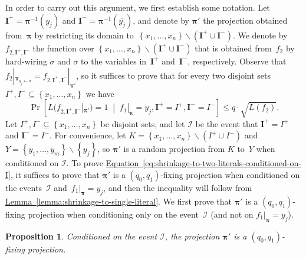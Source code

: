 \documentclass[11pt]{article}
\numberwithin{equation}{section}
\newtheorem{proposition}[theorem]{Proposition}
\theoremstyle{definition}
\theoremstyle{plain}
\newcommand{\expref}[2]{\hyperref[#2]{#1~\ref{#2}}}
\theoremstyle{definition}\newtheorem{notation}[theorem]{Notation}\theoremstyle{plain}
\newcommand{\p}{\boldsymbol{\pi}}
\newcommand{\cI}{\mathcal{I}}
\newcommand{\bI}{\boldsymbol{I}}
\theoremstyle{definition}
\theoremstyle{plain}
\begin{document}
In order to carry out this argument, we first establish some notation.
Let $\bI^{+}=\p^{-1}(y_{j})$ and $\bI^{-}=\p^{-1}(\overline{y_{j}})$,
and denote by $\p'$ the projection obtained from~$\p$ by restricting
its domain to~$\left\{ x_{1},\ldots,x_{n}\right\} \backslash(\bI^{+}\cup\bI^{-})$.
We denote by $f_{2,\bI^{+},\bI^{-}}$ the function over $\left\{ x_{1},\ldots,x_{n}\right\} \backslash(\bI^{+}\cup\bI^{-})$
that is obtained from~$f_{2}$ by hard-wiring $\sigma$ and $\overline{\sigma}$
to the variables in~$\bI^{+}$ and~$\bI^{-}$, respectively. Observe
that $f_{2}|_{\p_{y_{j}\gets\sigma}}=f_{2,\bI^{+},\bI^{-}}|_{\p'}$,
so it suffices to prove that for every two disjoint sets $I^{+},I^{-}\subseteq\left\{ x_{1},\ldots,x_{n}\right\} $
we have 
\begin{equation}
\Pr\!\left[L(f_{2,\bI^{+},\bI^{-}}|_{\p'})=1\;\middle|\;f_{1}|_{\p}=y_{j},\bI^{+}=I^{+},\bI^{-}=I^{-}\right]\le q\cdot\sqrt{L(f_{2})}.\label{eq:shrinkage-to-two-literals-conditioned-on-I}
\end{equation}
Let $I^{+},I^{-}\subseteq\left\{ x_{1},\ldots,x_{n}\right\} $ be
disjoint sets, and let $\cI$ be the event that $\bI^{+}=I^{+}$ and
$\bI^{-}=I^{-}$. For convenience, let $K=\left\{ x_{1},\ldots,x_{n}\right\} \backslash(I^{+}\cup I^{-})$
and $Y=\left\{ y_{1},\ldots,y_{m}\right\} \backslash\left\{ y_{j}\right\} $,
so $\p'$ is a random projection from $K$ to~$Y$ when conditioned
on $\cI$. To prove \expref{Equation}{eq:shrinkage-to-two-literals-conditioned-on-I},
it suffices to prove that $\p'$ is a $(q_{0},q_{1})$-fixing projection
when conditioned on the events~$\cI$ and~$f_{1}|_{\p}=y_{j}$,
and then the inequality will follow from \expref{Lemma}{lemma:shrinkage-to-single-literal}.
We first prove that $\p'$ is a $(q_{0},q_{1})$-fixing projection
when conditioning only on the event~$\cI$ (and not on $f_{1}|_{\p}=y_{j}$). 
\begin{proposition}
Conditioned on the event $\cI$, the projection $\p'$ is a $(q_{0},q_{1})$-fixing
projection. 
\end{proposition}
\end{document}
